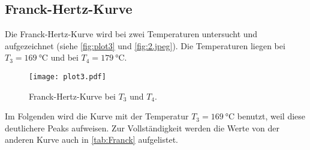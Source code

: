 
\subsection{Franck-Hertz-Kurve} %
\label{sub:Franck-Hertz-Kurve}
Die Franck-Hertz-Kurve wird bei zwei Temperaturen untersucht und aufgezeichnet (siehe \autoref{fig:plot3} und \autoref{fig:2.jpeg}). 
Die Temperaturen liegen bei $T_3= \qty{169}{\celsius}$ und bei $T_4= \qty{179}{\celsius}$.

\begin{figure}[H]
  \centering
  \texttt{[image: plot3.pdf]}
  \caption{Franck-Hertz-Kurve bei $T_3$ und $T_4$.}
  \label{fig:plot3}
\end{figure}

Im Folgenden wird die Kurve mit der Temperatur $T_3 = \qty{169}{\celsius}$ benutzt, weil diese deutlichere Peaks aufweisen. Zur Vollständigkeit
werden die Werte von der anderen Kurve auch in \autoref{tab:Franck} aufgelistet.








